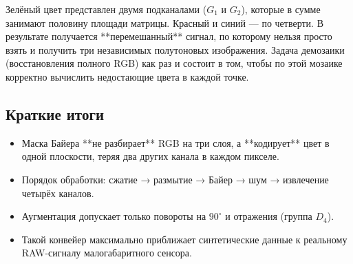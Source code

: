 \documentclass[12pt,a4paper]{article}
\begin{document}
Зелёный цвет представлен двумя подканалами ($G_1$ и $G_2$), которые в сумме занимают половину площади матрицы. Красный и синий — по четверти. В результате получается **перемешанный** сигнал, по которому нельзя просто взять и получить три независимых полутоновых изображения. Задача демозаики (восстановления полного RGB) как раз и состоит в том, чтобы по этой мозаике корректно вычислить недостающие цвета в каждой точке.

\subsection{Краткие итоги}

\begin{itemize}
    \item Маска Байера **не разбирает** RGB на три слоя, а **кодирует** цвет в одной плоскости, теряя два других канала в каждом пикселе.
    \item Порядок обработки: сжатие → размытие → Байер → шум → извлечение четырёх каналов.
    \item Аугментация допускает только повороты на $90^\circ$ и отражения (группа $D_4$).
    \item Такой конвейер максимально приближает синтетические данные к реальному RAW-сигналу малогабаритного сенсора.
\end{itemize}
\end{document}

